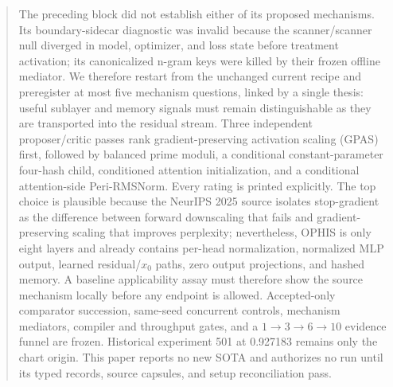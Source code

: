 \documentclass{article}
\begin{document}
\printAffiliationsAndNotice{}

\begin{abstract}
The preceding block did not establish either of its proposed mechanisms.
Its boundary-sidecar diagnostic was invalid because the scanner/scanner null
diverged in model, optimizer, and loss state before treatment activation; its
canonicalized n-gram keys were killed by their frozen offline mediator.  We
therefore restart from the unchanged current recipe and preregister at most
five mechanism questions, linked by a single thesis: useful sublayer and
memory signals must remain distinguishable as they are transported into the
residual stream.  Three independent proposer/critic passes rank
gradient-preserving activation scaling (GPAS) first, followed by balanced
prime moduli, a conditional constant-parameter four-hash child, conditioned
attention initialization, and a conditional attention-side Peri-RMSNorm.
Every rating is printed explicitly.  The top choice is plausible because the
NeurIPS 2025 source isolates stop-gradient as the difference between forward
downscaling that fails and gradient-preserving scaling that improves
perplexity; nevertheless, OPHIS is only eight layers and already contains
per-head normalization, normalized MLP output, learned residual/$x_0$ paths,
zero output projections, and hashed memory.  A baseline applicability assay
must therefore show the source mechanism locally before any endpoint is
allowed.  Accepted-only comparator succession, same-seed concurrent controls,
mechanism mediators, compiler and throughput gates, and a
$1\!\rightarrow\!3\!\rightarrow\!6\!\rightarrow\!10$ evidence funnel are
frozen.  Historical experiment 501 at 0.927183 remains only the chart origin.
This paper reports no new SOTA and authorizes no run until its typed records,
source capsules, and setup reconciliation pass.
\end{abstract}
\end{document}
